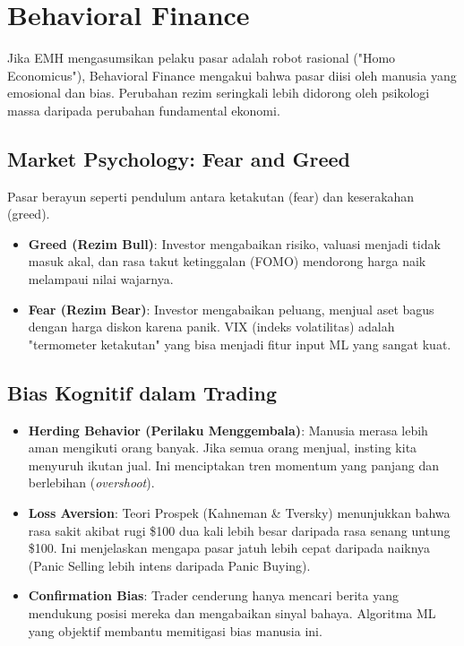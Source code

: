\documentclass[12pt,a4paper]{book}
\begin{document}
\section{Behavioral Finance}
Jika EMH mengasumsikan pelaku pasar adalah robot rasional ("Homo Economicus"), Behavioral Finance mengakui bahwa pasar diisi oleh manusia yang emosional dan bias. Perubahan rezim seringkali lebih didorong oleh psikologi massa daripada perubahan fundamental ekonomi.

\subsection{Market Psychology: Fear and Greed}
Pasar berayun seperti pendulum antara ketakutan (fear) dan keserakahan (greed).
\begin{itemize}
    \item \textbf{Greed (Rezim Bull)}: Investor mengabaikan risiko, valuasi menjadi tidak masuk akal, dan rasa takut ketinggalan (FOMO) mendorong harga naik melampaui nilai wajarnya.
    \item \textbf{Fear (Rezim Bear)}: Investor mengabaikan peluang, menjual aset bagus dengan harga diskon karena panik. VIX (indeks volatilitas) adalah "termometer ketakutan" yang bisa menjadi fitur input ML yang sangat kuat.
\end{itemize}

\subsection{Bias Kognitif dalam Trading}
\begin{itemize}
    \item \textbf{Herding Behavior (Perilaku Menggembala)}: Manusia merasa lebih aman mengikuti orang banyak. Jika semua orang menjual, insting kita menyuruh ikutan jual. Ini menciptakan tren momentum yang panjang dan berlebihan (\textit{overshoot}).
    \item \textbf{Loss Aversion}: Teori Prospek (Kahneman & Tversky) menunjukkan bahwa rasa sakit akibat rugi \$100 dua kali lebih besar daripada rasa senang untung \$100. Ini menjelaskan mengapa pasar jatuh lebih cepat daripada naiknya (Panic Selling lebih intens daripada Panic Buying).
    \item \textbf{Confirmation Bias}: Trader cenderung hanya mencari berita yang mendukung posisi mereka dan mengabaikan sinyal bahaya. Algoritma ML yang objektif membantu memitigasi bias manusia ini.
\end{itemize}
\end{document}
